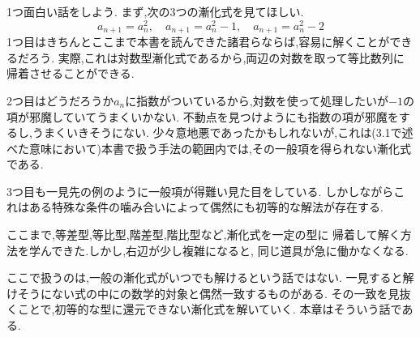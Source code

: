 1つ面白い話をしよう.
まず,次の3つの漸化式を見てほしい.
\[
  a_{n+1}=a_n^2,
  \quad
  a_{n+1}=a_n^2-1,
  \quad
  a_{n+1}=a_n^2-2
\]
1つ目はきちんとここまで本書を読んできた諸君らならば,容易に解くことができるだろう.
実際,これは対数型漸化式であるから,両辺の対数を取って等比数列に帰着させることができる.

2つ目はどうだろうか$a_n$に指数がついているから,対数を使って処理したいが$-1$の項が邪魔していてうまくいかない.
不動点を見つけようにも指数の項が邪魔をするし,うまくいきそうにない.
少々意地悪であったかもしれないが,これは(3.1で述べた意味において)本書で扱う手法の範囲内では,その一般項を得られない漸化式である.

3つ目も一見先の例のように一般項が得難い見た目をしている.
しかしながらこれはある特殊な条件の噛み合いによって偶然にも初等的な解法が存在する.

ここまで,等差型,等比型,階差型,階比型など,漸化式を一定の型に
帰着して解く方法を学んできた.しかし,右辺が少し複雑になると,
同じ道具が急に働かなくなる.

ここで扱うのは,一般の漸化式がいつでも解けるという話ではない.
一見すると解けそうにない式の中にの数学的対象と偶然一致するものがある.
その一致を見抜くことで,初等的な型に還元できない漸化式を解いていく.
本章はそういう話である.